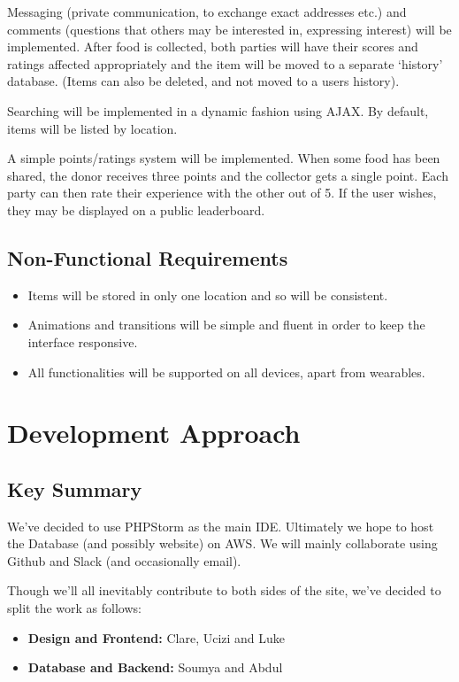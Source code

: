 \documentclass[12pt]{article}
\begin{document}
Messaging (private communication, to exchange exact addresses etc.) and
comments (questions that others may be interested in, expressing interest)
will be implemented.
After food is collected, both parties will have their
scores and ratings affected appropriately and the item will be moved to a
separate ‘history’ database.
(Items can also be deleted, and not moved to a users history).

Searching will be implemented in a dynamic fashion using AJAX. By default,
items will be listed by location.

A simple points/ratings system will be implemented. When some food has been
shared, the donor receives three points and the collector gets a single point.
Each party can then rate their experience with the other out of 5.
If the user wishes, they may be displayed on a public leaderboard.


\subsection{Non-Functional Requirements}
\begin{itemize}
    \item Items will be stored in only one location and so will be consistent.
    \item Animations and transitions will be simple and fluent in order to keep
        the interface responsive.
    \item All functionalities will be supported on all devices, apart from
        wearables.
\end{itemize}


\section{Development Approach}

\subsection{Key Summary}
We've decided to use PHPStorm as the main IDE. Ultimately we hope to host the
Database (and possibly website) on AWS. We will mainly collaborate using
Github and Slack (and occasionally email).

Though we'll all inevitably contribute to both sides of the site, we've
decided to split the work as follows:
\begin{itemize}
    \item \textbf{Design and Frontend:} Clare, Ucizi and Luke
    \item \textbf{Database and Backend:} Soumya and Abdul
\end{itemize}
\end{document}
